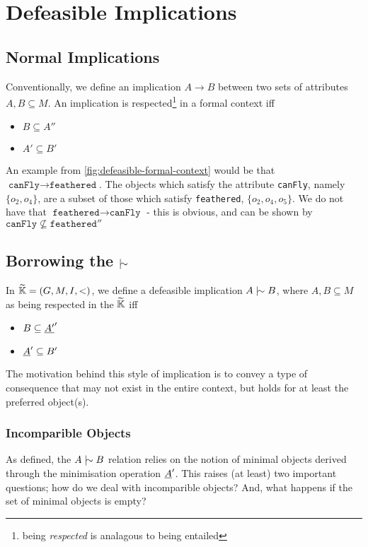 \documentclass[11pt]{article}
\begin{document}
\section{Defeasible Implications}
\subsection{Normal Implications}
Conventionally, we define an implication $A\rightarrow B$ between two sets of attributes $A,B \subseteq M$. An implication is respected\footnote{being \textit{respected} is analagous to being entailed} in a formal context iff

\begin{itemize}
  \item $B \subseteq A''$
  \item $A' \subseteq B'$
\end{itemize}

An example from \autoref{fig:defeasible-formal-context} would be that $\texttt{canFly} \rightarrow \texttt{feathered}$. The objects which satisfy the attribute \texttt{canFly}, namely $\{o_2, o_4\}$, are a subset of those which satisfy \texttt{feathered}, $\{o_2, o_4, o_5\}$. We do not have that $\texttt{feathered} \rightarrow \texttt{canFly}$ - this is obvious, and can be shown by $\texttt{canFly} \not \subseteq \texttt{feathered}''$

\subsection{Borrowing the $\twiddle$}
In $\widetilde{\mathbb{K}} = (G,M,I, <)$, we define a defeasible implication $A \twiddle B$, where $A,B \subseteq M$ as being respected in the $\widetilde{\mathbb{K}}$ iff
\begin{itemize}
  \item $B \subseteq \underline{A'}'$
  \item $\underline{A}' \subseteq B'$
\end{itemize}

The motivation behind this style of implication is to convey a type of consequence that may not exist in the entire context, but holds for at least the preferred object(s).

\subsubsection{Incomparible Objects}

As defined, the $A \twiddle B$ relation relies on the notion of minimal objects derived through the minimisation operation $\underline{A}'$. This raises (at least) two important questions; how do we deal with incomparible objects? And, what happens if the set of minimal objects is empty?
\end{document}
